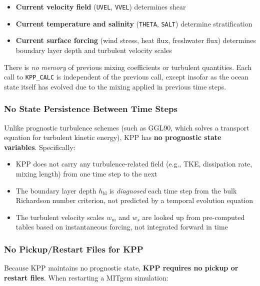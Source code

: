 \documentclass[12pt,letterpaper]{article}
\begin{document}
\begin{itemize}[leftmargin=*]
  \item \textbf{Current velocity field} (\texttt{UVEL}, \texttt{VVEL}) determines shear
  \item \textbf{Current temperature and salinity} (\texttt{THETA}, \texttt{SALT})
        determine stratification
  \item \textbf{Current surface forcing} (wind stress, heat flux, freshwater flux)
        determines boundary layer depth and turbulent velocity scales
\end{itemize}

There is \textit{no memory} of previous mixing coefficients or turbulent
quantities. Each call to \texttt{KPP\_CALC} is independent of the previous call,
except insofar as the ocean state itself has evolved due to the mixing applied
in previous time steps.

\subsubsection{No State Persistence Between Time Steps}

Unlike prognostic turbulence schemes (such as GGL90, which solves a transport
equation for turbulent kinetic energy), KPP has \textbf{no prognostic state
variables}. Specifically:

\begin{itemize}[leftmargin=*]
  \item KPP does not carry any turbulence-related field (e.g., TKE, dissipation rate,
        mixing length) from one time step to the next
  \item The boundary layer depth $h_{\text{bl}}$ is \textit{diagnosed} each time step
        from the bulk Richardson number criterion, not predicted by a temporal evolution
        equation
  \item The turbulent velocity scales $w_m$ and $w_s$ are looked up from pre-computed
        tables based on instantaneous forcing, not integrated forward in time
\end{itemize}

\subsubsection{No Pickup/Restart Files for KPP}

Because KPP maintains no prognostic state, \textbf{KPP requires no pickup or
restart files}. When restarting a MITgcm simulation:
\end{document}
